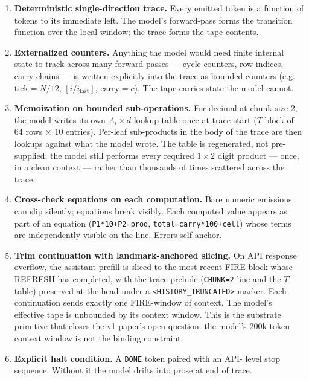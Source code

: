 \documentclass[twocolumn,switch,10pt]{article}
\providecommand{\tightlist}{\setlength{\itemsep}{0pt}\setlength{\parskip}{0pt}}
\begin{document}
\begin{enumerate}
\def\labelenumi{\arabic{enumi}.}
\tightlist
\item
  \textbf{Deterministic single-direction trace.} Every emitted token is a
  function of tokens to its immediate left. The model's
  forward-pass forms the transition function over the local window;
  the trace forms the tape contents.
\item
  \textbf{Externalized counters.} Anything the model would need finite
  internal state to track across many forward passes --- cycle
  counters, row indices, carry chains --- is written explicitly into
  the trace as bounded counters (e.g.~\(\text{tick}=N/12\),
  \([i/i_{\text{last}}]\), \(\text{carry}=c\)). The tape carries state
  the model cannot.
\item
  \textbf{Memoization on bounded sub-operations.} For decimal at
  chunk-size 2, the model writes its own \(A_i \times d\) lookup table
  once at trace start (\(T\) block of 64 rows × 10 entries). Per-leaf
  sub-products in the body of the trace are then lookups against
  what the model wrote. The table is regenerated, not pre-supplied;
  the model still performs every required \(1 \times 2\) digit product
  --- once, in a clean context --- rather than thousands of times
  scattered across the trace.
\item
  \textbf{Cross-check equations on each computation.} Bare numeric
  emissions can slip silently; equations break visibly. Each
  computed value appears as part of an equation (\texttt{P1*10+P2=prod},
  \texttt{total=carry*100+cell}) whose terms are independently visible on
  the line. Errors self-anchor.
\item
  \textbf{Trim continuation with landmark-anchored slicing.} On API
  response overflow, the assistant prefill is sliced to the most
  recent FIRE block whose REFRESH has completed, with the trace
  prelude (\texttt{CHUNK=2} line and the \(T\) table) preserved at the head
  under a \texttt{\textless{}HISTORY\_TRUNCATED\textgreater{}} marker. Each continuation sends
  exactly one FIRE-window of context. The model's effective tape is
  unbounded by its context window. This is the substrate primitive
  that closes the v1 paper's open question: the model's 200k-token
  context window is not the binding constraint.
\item
  \textbf{Explicit halt condition.} A \texttt{DONE} token paired with an API-
  level stop sequence. Without it the model drifts into prose at
  end of trace.
\end{enumerate}
\end{document}
